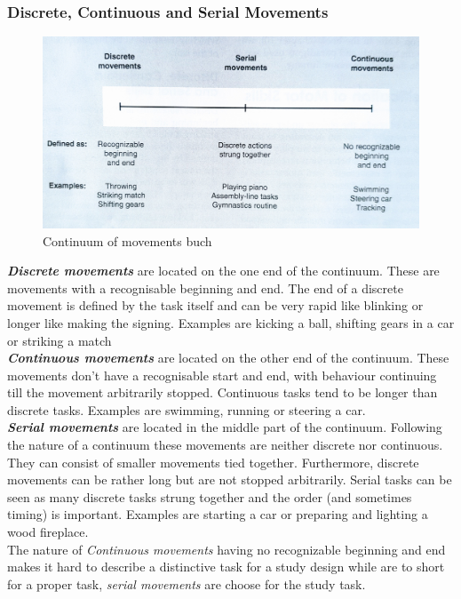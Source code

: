 \subsubsection{Discrete, Continuous and Serial Movements}
\begin{figure}
	\centering
	\includegraphics[width=1.0\textwidth]{img/movements_cont.jpg}
	\caption{Continuum of movements buch \cite{Schmidt2011}}
	\label{fig:movements_cont}
\end{figure}
\textit{\textbf{Discrete movements}} are located on the one end of the continuum. These are movements with a recognisable beginning and end. The end of a discrete movement is defined by the task itself and can be very rapid like blinking or longer like making the signing. Examples are kicking a ball, shifting gears in a car or striking a match\\
\textit{\textbf{Continuous movements}} are located on the other end of the continuum. These movements don't have a recognisable start and end, with behaviour continuing till the movement arbitrarily stopped. Continuous tasks tend to be longer than discrete tasks. Examples are swimming, running or steering a car.\\
\textit{\textbf{Serial movements}} are located in the middle part of the continuum. Following the nature of a continuum these movements are neither discrete nor continuous. They can consist of smaller movements tied together. Furthermore, discrete movements can be rather long but are not stopped arbitrarily. Serial tasks can be seen as many discrete tasks strung together and the order (and sometimes timing) is important. Examples are starting a car or preparing and lighting a wood fireplace.\\
The nature of \textit{Continuous movements} having no recognizable beginning and end makes it hard to describe a distinctive task for a study design while  are to short for a proper task, \textit{serial movements} are choose for the study task\markme.

